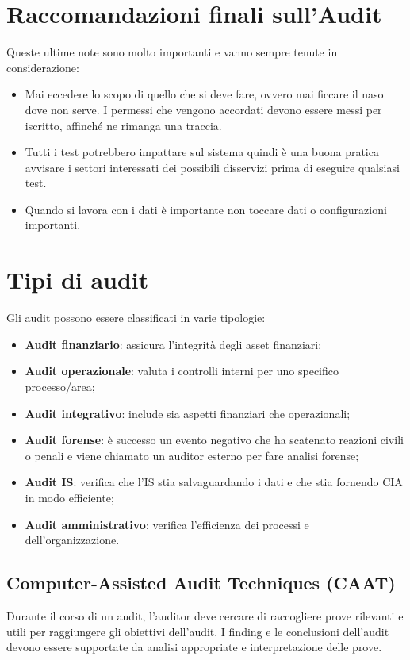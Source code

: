 \section{Raccomandazioni finali sull'Audit}

Queste ultime note sono molto importanti e vanno sempre tenute in
considerazione:
\begin{itemize}
\item Mai eccedere lo scopo di quello che si deve fare, ovvero mai ficcare il
naso dove non serve. I permessi che vengono accordati devono essere messi per
iscritto, affinché ne rimanga una traccia.
\item Tutti i test potrebbero impattare sul sistema quindi è una buona
pratica avvisare i settori interessati dei possibili disservizi prima di eseguire
qualsiasi test.
\item Quando si lavora con i dati è importante non toccare dati o configurazioni
importanti.
\end{itemize}


\section{Tipi di audit}

Gli audit possono essere classificati in varie tipologie:
\begin{itemize}
\item \textbf{Audit finanziario}: assicura l'integrità degli asset
finanziari;
\item \textbf{Audit operazionale}: valuta i controlli interni per uno
specifico processo/area;
\item \textbf{Audit integrativo}: include sia aspetti finanziari
che operazionali;
\item \textbf{Audit forense}: è successo un evento negativo che ha
scatenato reazioni civili o penali e viene chiamato un auditor
esterno per fare analisi forense;
\item \textbf{Audit IS}: verifica che l'IS stia salvaguardando i dati
e che stia fornendo CIA in modo efficiente;
\item \textbf{Audit amministrativo}: verifica l'efficienza dei processi
e dell'organizzazione.
\end{itemize}


\subsection{Computer-Assisted Audit Techniques (CAAT)}
Durante il corso di un audit, l'auditor deve cercare di raccogliere
prove rilevanti e utili per raggiungere gli obiettivi dell'audit.
I finding e le conclusioni dell'audit devono essere supportate da 
analisi appropriate e interpretazione delle prove.

